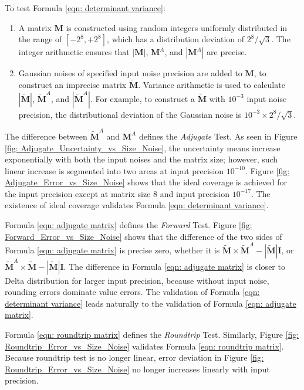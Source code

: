 \documentclass[twoside]{article}
\numberwithin{equation}{section}
\begin{document}
To test Formula \eqref{eqn: determinant variance}:
\begin{enumerate}
\item A matrix $\mathbf{M}$ is constructed using random integers uniformly distributed in the range of $[-2^8, +2^8]$, which has a distribution deviation of $2^8/\sqrt{3}$.
The integer arithmetic ensures that $|\mathbf{M}|$, $\mathbf{M}^A$, and $|\mathbf{M}^A|$ are precise.

\item Gaussian noises of specified input noise precision are added to $\mathbf{M}$, to construct an imprecise matrix $\widetilde{\mathbf{M}}$.
Variance arithmetic is used to calculate $|\widetilde{\mathbf{M}}|$, $\widetilde{\mathbf{M}}^A$, and $|\widetilde{\mathbf{M}}^A|$.
For example, to construct a $\widetilde{\mathbf{M}}$ with $10^{-3}$ input noise precision, the distributional deviation of the Gaussian noise is $10^{-3} \times 2^8/\sqrt{3}$.

\end{enumerate}

The difference between $\widetilde{\mathbf{M}}^A$ and $\mathbf{M}^A$ defines the \emph{Adjugate} Test.
As seen in Figure \ref{fig: Adjugate_Uncertainty_vs_Size_Noise}, the uncertainty means increase exponentially with both the input noises and the matrix size; however, such linear increase is segmented into two areas at input precision $10^{-10}$.
Figure \ref{fig: Adjugate_Error_vs_Size_Noise} shows that the ideal coverage is achieved for the input precision except at matrix size $8$ and input precision $10^{-17}$.
The existence of ideal coverage validates Formula \eqref{eqn: determinant variance}.

Formula \eqref{eqn: adjugate matrix} defines the \emph{Forward} Test.
Figure \ref{fig: Forward_Error_vs_Size_Noise} shows that the difference of the two sides of Formula \eqref{eqn: adjugate matrix} is precise zero, whether it is $\widetilde{\mathbf{M}} \times \widetilde{\mathbf{M}}^A - |\widetilde{\mathbf{M}}| \mathbf{I}$, or $\widetilde{\mathbf{M}}^A \times \widetilde{\mathbf{M}} - |\widetilde{\mathbf{M}}| \mathbf{I}$.   
The difference in Formula \eqref{eqn: adjugate matrix} is closer to Delta distribution for larger input precision, because without input noise, rounding errors dominate value errors.
The validation of Formula \eqref{eqn: determinant variance} leads naturally to the validation of Formula \eqref{eqn: adjugate matrix}. 

Formula \eqref{eqn: roundtrip  matrix} defines the \emph{Roundtrip} Test.
Similarly, Figure \ref{fig: Roundtrip_Error_vs_Size_Noise} validates Formula \eqref{eqn: roundtrip matrix}.
Because roundtrip test is no longer linear, error deviation in Figure \ref{fig: Roundtrip_Error_vs_Size_Noise} no longer increases linearly with input precision.
\end{document}
